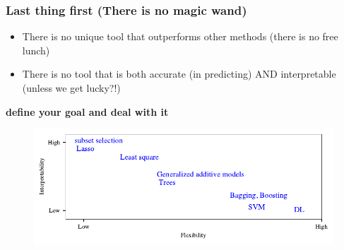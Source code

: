 \documentclass[serif, xcolor={dvipsnames}]{beamer} %
\begin{document}
\begin{frame}[t]
\frametitle{Last thing first (There is no magic wand)}

\begin{itemize}[<+->]
\item There is no unique tool that outperforms other methods (there is no free lunch) 
\item There is no tool that is both accurate (in predicting) AND interpretable (unless we get lucky?!)
\end{itemize}

\pause
\vspace{.05in}
\begin{tcolorbox}
\centering
{\bf define your goal and deal with it}
\end{tcolorbox}

\pause
\vspace{-.1in}
\begin{figure}[htbp]
\centering
\includegraphics[width=\linewidth]{model_flex_inter}
\end{figure}

\end{frame}








\end{document}
